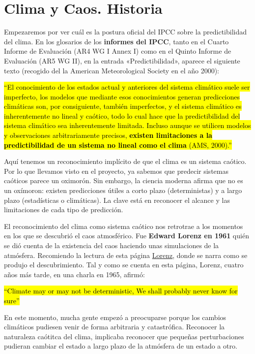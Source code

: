 \documentclass[
  11pt,
  a4paper,
  DIV=11,
  numbers=noendperiod]{scrreprt}
\begin{document}
\section{Clima y Caos. Historia}\label{clima-y-caos.-historia}

Empezaremos por ver cuál es la postura oficial del IPCC sobre la
predictibilidad del clima. En los glosarios de los \textbf{informes del
IPCC}, tanto en el Cuarto Informe de Evaluación (AR4 WG I Annex I) como
en el Quinto Informe de Evaluación (AR5 WG II), en la entrada
«Predictibilidad», aparece el siguiente texto (recogido del la American
Meteorological Society en el año 2000):

\hl{``El conocimiento de los estados actual y anteriores del sistema
climático suele ser imperfecto, los modelos que mediante esos
conocimientos generan predicciones climáticas son, por consiguiente,
también imperfectos, y el sistema climático es inherentemente no lineal
y caótico, todo lo cual hace que la predictibilidad del sistema
climático sea inherentemente limitada. Incluso aunque se utilicen
modelos y observaciones arbitrariamente precisos, \textbf{existen
limitaciones a la predictibilidad de un sistema no lineal como el clima}
(AMS, 2000).''}

Aquí tenemos un reconocimiento implícito de que el clima es un sistema
caótico. Por lo que llevamos visto en el proyecto, ya sabemos que
predecir sistemas caóticos parece un oximorón. Sin embargo, la ciencia
moderna afirma que no es un oxímoron: existen predicciones útiles a
corto plazo (deterministas) y a largo plazo (estadísticas o climáticas).
La clave está en reconocer el alcance y las limitaciones de cada tipo de
predicción.

El reconocimiento del clima como sistema caótico nos retrotrae a los
momentos en los que se descubrió el caos atmosférico. Fue \textbf{Edward
Lorenz en 1961} quién se dió cuenta de la existencia del caos haciendo
unas simulaciones de la atmósfera. Recomiendo la lectura de esta página
\href{https://history.aip.org/climate/chaos.htm}{Lorenz}, donde se narra
como se produjo el descubrimiento. Tal y como se cuenta en esta página,
Lorenz, cuatro años más tarde, en una charla en 1965, afirmó:

\hl{``Climate may or may not be deterministic, We shall probably never
know for sure''}

En este momento, mucha gente empezó a preocuparse porque los cambios
climáticos pudiesen venir de forma arbitraria y catastrófica. Reconocer
la naturaleza caótitca del clima, implicaba reconocer que pequeñas
perturbaciones pudieran cambiar el estado a largo plazo de la atmósfera
de un estado a otro.
\end{document}
